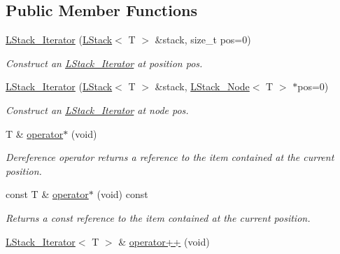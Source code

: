 \subsection*{Public Member Functions}
\begin{DoxyCompactItemize}
\item 
\hyperlink{classMadara_1_1Utility_1_1LStack__Iterator_af13e78b662a1308c310c24e109f5dc30}{LStack\_\-Iterator} (\hyperlink{classMadara_1_1Utility_1_1LStack}{LStack}$<$ T $>$ \&stack, size\_\-t pos=0)
\begin{DoxyCompactList}\small\item\em Construct an \hyperlink{classMadara_1_1Utility_1_1LStack__Iterator}{LStack\_\-Iterator} at position pos. \item\end{DoxyCompactList}\item 
\hyperlink{classMadara_1_1Utility_1_1LStack__Iterator_a4a52dd0961ba3ebfee08c45e783e029f}{LStack\_\-Iterator} (\hyperlink{classMadara_1_1Utility_1_1LStack}{LStack}$<$ T $>$ \&stack, \hyperlink{classMadara_1_1Utility_1_1LStack__Node}{LStack\_\-Node}$<$ T $>$ $\ast$pos=0)
\begin{DoxyCompactList}\small\item\em Construct an \hyperlink{classMadara_1_1Utility_1_1LStack__Iterator}{LStack\_\-Iterator} at node pos. \item\end{DoxyCompactList}\item 
T \& \hyperlink{classMadara_1_1Utility_1_1LStack__Iterator_aa6cd2e6aa6173799d09454c83d29a9c4}{operator$\ast$} (void)
\begin{DoxyCompactList}\small\item\em Dereference operator returns a reference to the item contained at the current position. \item\end{DoxyCompactList}\item 
const T \& \hyperlink{classMadara_1_1Utility_1_1LStack__Iterator_a3267e7de4c99ef7adb248f46ed3051aa}{operator$\ast$} (void) const 
\begin{DoxyCompactList}\small\item\em Returns a const reference to the item contained at the current position. \item\end{DoxyCompactList}\item 
\hyperlink{classMadara_1_1Utility_1_1LStack__Iterator}{LStack\_\-Iterator}$<$ T $>$ \& \hyperlink{classMadara_1_1Utility_1_1LStack__Iterator_a79dbf4028293d5641a9a4ef9310fb1dc}{operator++} (void)

\end{DoxyCompactItemize}
